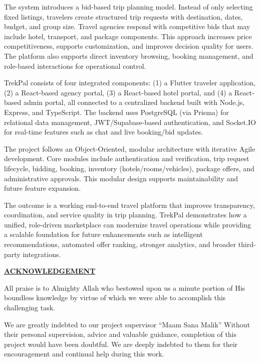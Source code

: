 \documentclass[12pt,a4paper]{article}
\begin{document}
The system introduces a bid-based trip planning model. Instead of only selecting fixed listings, travelers create structured trip requests with destination, dates, budget, and group size. Travel agencies respond with competitive bids that may include hotel, transport, and package components. This approach increases price competitiveness, supports customization, and improves decision quality for users. The platform also supports direct inventory browsing, booking management, and role-based interactions for operational control.\par


TrekPal consists of four integrated components: (1) a Flutter traveler application, (2) a React-based agency portal, (3) a React-based hotel portal, and (4) a React-based admin portal, all connected to a centralized backend built with Node.js, Express, and TypeScript. The backend uses PostgreSQL (via Prisma) for relational data management, JWT/Supabase-based authentication, and Socket.IO for real-time features such as chat and live booking/bid updates.\par


The project follows an Object-Oriented, modular architecture with iterative Agile development. Core modules include authentication and verification, trip request lifecycle, bidding, booking, inventory (hotels/rooms/vehicles), package offers, and administrative approvals. This modular design supports maintainability and future feature expansion.\par


The outcome is a working end-to-end travel platform that improves transparency, coordination, and service quality in trip planning. TrekPal demonstrates how a unified, role-driven marketplace can modernize travel operations while providing a scalable foundation for future enhancements such as intelligent recommendations, automated offer ranking, stronger analytics, and broader third-party integrations.\par


\clearpage

{\centering\bfseries\underline{ACKNOWLEDGEMENT}\par}
\vspace{8pt}

All praise is to Almighty Allah who bestowed upon us a minute portion of His boundless knowledge by virtue of which we were able to accomplish this challenging task.\par


We are greatly indebted to our project supervisor ``Maam Sana Malik'' Without their personal supervision, advice and valuable guidance, completion of this project would have been doubtful. We are deeply indebted to them for their encouragement and continual help during this work.\par
\end{document}
